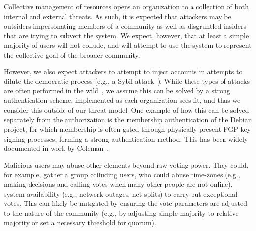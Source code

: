 Collective management of resources opens an organization to a collection of both
internal and external threats. As such, it is expected that attackers may be
outsiders impersonating members of a community as well as disgruntled insiders
that are trying to subvert the system. We expect, however, that at least a
simple majority of users will not collude, and will attempt to use the system
to represent the collective goal of the broader community.

However, we also expect attackers to attempt to inject accounts in attempts to
dilute the democratic process (e.g., a Sybil attack~\cite{sybil1, sybil2}).
While these types of attacks are often performed in the wild~\cite{197120},
we assume this can be solved by a strong authentication scheme, implemented as
each organization sees fit, and thus we consider this outside of our threat
model. One example of how this can be solved separately from the authorization
is the membership authentication of the Debian project, for which membership is
often gated through physically-present PGP key signing processes, forming a
strong authentication method. This has been widely documented in work by
Coleman~\cite{coleman-oss}. 

Malicious users may abuse other elements beyond raw voting power. They could,
for example, gather a group colluding users, who could abuse time-zones (e.g.,
making decisions and calling votes when many other people are not online),
system availability (e.g., network outages, net-splits) to carry out exceptional
votes. This can likely be mitigated by ensuring the vote parameters are adjusted
to the nature of the community (e.g., by adjusting simple majority to relative
majority or set a necessary threshold for quorum).
